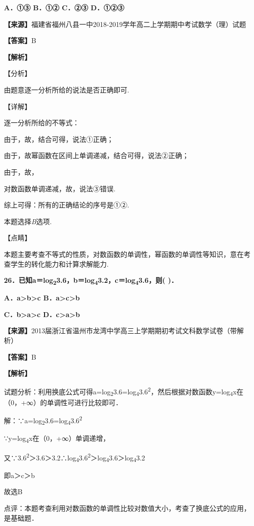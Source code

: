 \documentclass[
]{article}
\begin{document}
\textbf{A．①③ B．①② C．②③ D．①②③}

\textbf{【来源】}福建省福州八县一中2018-2019学年高二上学期期中考试数学（理）试题

\textbf{【答案】}B

\textbf{【解析】}

【分析】

由题意逐一分析所给的说法是否正确即可.

【详解】

逐一分析所给的不等式：

由于，故，结合可得，说法①正确；

由于，故幂函数在区间上单调递减，结合可得，说法②正确；

由于，故，

对数函数单调递减，故，说法③错误.

综上可得：所有的正确结论的序号是①②.

本题选择\emph{B}选项.

【点睛】

本题主要考查不等式的性质，对数函数的单调性，幂函数的单调性等知识，意在考查学生的转化能力和计算求解能力.

\textbf{26．已知a＝log\textsubscript{2}3.6，b＝log\textsubscript{4}3.2，c＝log\textsubscript{4}3.6，则(
)．}

\textbf{A．a\textgreater b\textgreater c
B．a\textgreater c\textgreater b}

\textbf{C．b\textgreater a\textgreater c
D．c\textgreater a\textgreater b}

\textbf{【来源】}2013届浙江省温州市龙湾中学高三上学期期初考试文科数学试卷（带解析）

\textbf{【答案】}B

\textbf{【解析】}

试题分析：利用换底公式可得a=log\textsubscript{2}3.6=log\textsubscript{4}3.6\textsuperscript{2}，然后根据对数函数y=log\textsubscript{4}x在（0，+∞）的单调性可进行比较即可．

解：∵a=log\textsubscript{2}3.6=log\textsubscript{4}3.6\textsuperscript{2}

∵y=log\textsubscript{4}x在（0，+∞）单调递增，

又∵3.6\textsuperscript{2}＞3.6＞3.2∴log\textsubscript{4}3.6\textsuperscript{2}＞log\textsubscript{4}3.6＞log\textsubscript{4}3.2

即a＞c＞b

故选B

点评：本题考查利用对数函数的单调性比较对数值大小，考查了换底公式的应用，是基础题．
\end{document}
